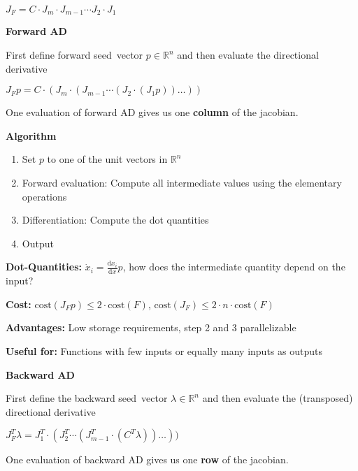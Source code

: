 \begin{tcolorbox}[colback=orange!5!white, %
  colframe=orange!75!black, %
  title=\textbf{Calculating Derivatives}]
\begin{center}
	\vspace{-0.1cm}
	$J_F = C \cdot J_{m} \cdot J_{m-1} \cdots J_2 \cdot J_1$
	\vspace{-0.0cm}
\end{center}

\begin{center}
	\vspace{-0.1cm}
	\textbf{Forward AD}
	\vspace{-0.2cm}
\end{center}
First define \grqq forward seed\grqq\ vector $p \in \mathbb{R}^n$ and then evaluate the directional derivative
\begin{center}
	\vspace{-0.2cm}
	$J_Fp = C \cdot (J_{m} \cdot (J_{m-1} \cdots (J_2 \cdot (J_1p)) \dots))$
	\vspace{-0.1cm}
\end{center}
One evaluation of forward AD gives us one \textbf{column} of the jacobian.

\textbf{Algorithm}
\begin{enumerate}
	\item Set $p$ to one of the unit vectors in $\mathbb{R}^n$
	\item Forward evaluation: Compute all intermediate values using the elementary operations
	\item Differentiation: Compute the dot quantities
	\item Output
\end{enumerate}

\textbf{Dot-Quantities:} $\dot{x}_i = \frac{\text{d}x_i}{\text{d}x}p$, \grqq how does the intermediate quantity depend on the input?\grqq

\textbf{Cost:} $\text{cost}(J_Fp) \leq 2 \cdot \text{cost}(F)$, $\text{cost}(J_F) \leq 2 \cdot n \cdot \text{cost}(F)$

\textbf{Advantages:} Low storage requirements, step 2 and 3 parallelizable

\textbf{Useful for:} Functions with few inputs or equally many inputs as outputs

\begin{center}
	\vspace{-0.1cm}
	\textbf{Backward AD}
	\vspace{-0.2cm}
\end{center}
First define the \grqq backward seed\grqq\ vector $\lambda \in \mathbb{R}^n$ and then evaluate the (transposed) directional derivative
\begin{center}
	\vspace{-0.1cm}
	$J_F^T\lambda = J_1^T \cdot (J_2^T \cdots (J_{m-1}^T \cdot (C^T\lambda))\dots))$
	\vspace{-0.1cm}
\end{center}
One evaluation of backward AD gives us one \textbf{row} of the jacobian.


\end{tcolorbox}
